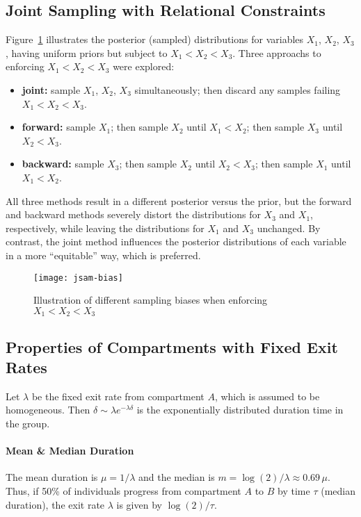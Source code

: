 \subsection{Joint Sampling with Relational Constraints}\label{app.model.math.jsam}
Figure~\ref{fig:jsam.bias} illustrates the posterior (sampled) distributions
for variables $X_1$, $X_2$, $X_3$, having uniform priors but subject to $X_1 < X_2 < X_3$.
Three approachs to enforcing $X_1 < X_2 < X_3$ were explored:
\begin{itemize}
  \item \textbf{joint:}
    sample $X_1$, $X_2$, $X_3$ simultaneously;
    then discard any samples failing $X_1 < X_2 < X_3$.
  \item \textbf{forward:}
    sample $X_1$;
    then sample $X_2$ until $X_1 < X_2$;
    then sample $X_3$ until $X_2 < X_3$.
  \item \textbf{backward:}
    sample $X_3$;
    then sample $X_2$ until $X_2 < X_3$;
    then sample $X_1$ until $X_1 < X_2$.
\end{itemize}
All three methods result in a different posterior versus the prior,
but the forward and backward methods
severely distort the distributions for $X_3$ and $X_1$, respectively,
while leaving the distributions for $X_1$ and $X_3$ unchanged.
By contrast, the joint method influences the posterior distributions of each variable
in a more ``equitable'' way, which is preferred.
\begin{figure}[h]
  \centering
  \texttt{[image: jsam-bias]}
  \caption{Illustration of different sampling biases when enforcing $X_1 < X_2 < X_3$}
  \label{fig:jsam.bias}
\end{figure}
\subsection{Properties of Compartments with Fixed Exit Rates}\label{app.model.math.exp}
Let $\lambda$ be the fixed exit rate from compartment $A$, which is assumed to be homogeneous.
Then $\delta \sim \lambda e^{-\lambda \delta}$ is %
the exponentially distributed duration time in the group.
\paragraph{Mean \& Median Duration}
The mean duration is $\mu = 1/\lambda$ and the median is $m = \log(2)/\lambda \approx 0.69\,\mu$.
Thus, if 50\% of individuals progress from compartment $A$ to $B$ by time $\tau$ (median duration),
the exit rate $\lambda$ is given by $\log(2)/\tau$.

